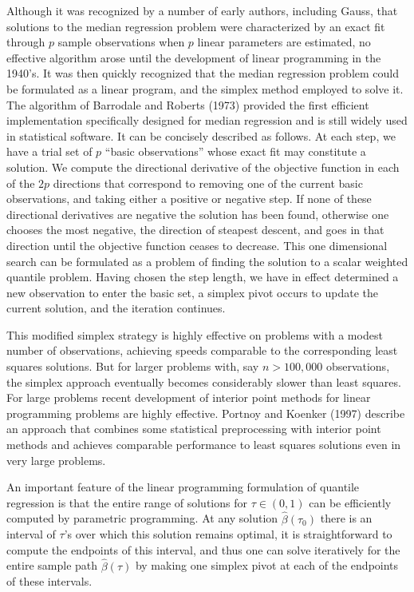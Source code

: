 \documentclass{amsart}
\begin{document}
Although it was recognized by a number of early authors, including Gauss,
that solutions to the median regression problem were characterized by an
exact fit through $p$ sample observations when $p$ linear parameters  
are estimated, no effective algorithm arose until the development of
linear programming in the 1940's.  It was then quickly recognized that the
median regression problem could  be formulated as a linear program, and
the simplex method employed to solve it.  
The algorithm of Barrodale and
Roberts (1973) provided the first efficient implementation specifically
designed for median regression and is still widely used in statistical
software.  It can be concisely described as follows.  At each step, we
have a trial set of $p$ ``basic observations'' whose exact fit may constitute
a solution.  We compute the directional derivative of the objective 
function in each of the $2p$ directions that correspond to removing one
of the current basic observations, and taking either a positive or negative
step.  If none of these directional derivatives are negative
the solution has been found, 
otherwise one chooses the most negative, the direction of
steapest descent, and goes in that direction until the objective function
ceases to decrease.  This one dimensional search can be formulated as 
a problem of finding the solution to a scalar weighted quantile problem.
Having chosen the step length, we have in effect determined a new observation
to enter the basic set, a simplex pivot occurs to update the current solution,
and the iteration continues.

This modified simplex strategy is highly effective on problems with a 
modest number of observations, achieving speeds comparable to the corresponding
least squares solutions.
But for larger problems with, say $n>100,000$ observations,
the simplex approach eventually becomes considerably slower than least
squares.  For large problems recent development of interior point methods
for linear programming problems are highly effective.  
Portnoy and Koenker (1997) describe an approach that combines some
statistical preprocessing with interior point methods and achieves
comparable performance to least squares solutions even in very large problems.

An important feature of the linear programming formulation of quantile
regression is that the entire range of solutions for $\tau \in (0,1)$
can be efficiently computed by parametric programming.  
At any solution $\hat \beta(\tau_0)$ there is an interval of 
$\tau$'s over which this solution remains optimal, it is straightforward to
compute the endpoints of this interval, and thus one can solve iteratively
for the entire sample path $\hat \beta (\tau)$ by making one simplex pivot
at each of the endpoints of these intervals. 
\end{document}
